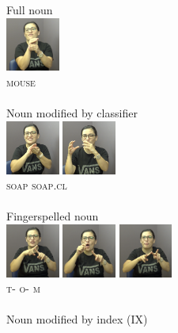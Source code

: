 \documentclass[review]{elsarticle} %
\begin{document}
\begin{multicols}{2}
\begin{exe}
\ex
\begin{xlist}
\ex \label{ex:6a} Full noun \\\glll
\includegraphics[width=50pt]{pictures/1a_1.png}\\ \textsc{mouse\footnotemark} \\ \\ 
\ex \label{ex:6b} Noun modified by classifier \\\glll
\includegraphics[width=50pt]{pictures/1c_2.png} \includegraphics[width=50pt]{pictures/1c_1.png} \\ \textsc{soap} \textsc{soap.cl} \\ \\ 
\ex \label{ex:6c} Fingerspelled noun\\\glll 
\includegraphics[width=50pt]{pictures/1b_1.png} \includegraphics[width=50pt]{pictures/1b_2.png} \includegraphics[width=50pt]{pictures/1b_3.png}\\ \textsc{t-} \textsc{o-} \textsc{m} \\ \\
\ex \label{ex:6d} Noun modified by index (\textsc{IX})\\\glll 

\end{xlist}
\end{exe}
\end{multicols}
\end{document}
